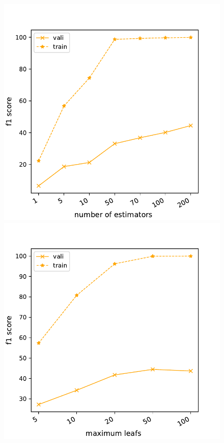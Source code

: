 \documentclass[11pt]{article}
\begin{document}
\begin{figure}[t]
\begin{minipage}[t]{0.33\textwidth}
\end{minipage}
\begin{minipage}[t]{0.33\textwidth}
\includegraphics[width=1\linewidth]{amazon/RF_nestimators.pdf}
\end{minipage}
\begin{minipage}[t]{0.33\textwidth}
\includegraphics[width=1\linewidth]{amazon/RF_max_leafs.pdf}

\end{minipage}
\end{figure}
\end{document}
